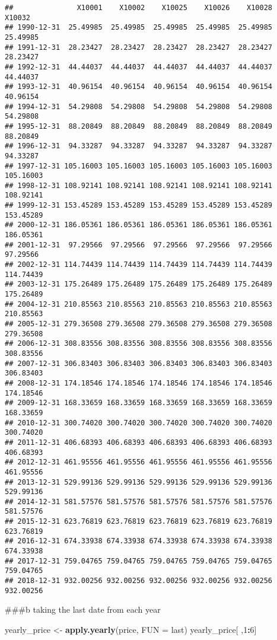 \documentclass[
]{article}
\newenvironment{Shaded}{\begin{snugshade}}{\end{snugshade}}
\newcommand{\AttributeTok}[1]{\textcolor[rgb]{0.13,0.29,0.53}{#1}}
\newcommand{\DecValTok}[1]{\textcolor[rgb]{0.00,0.00,0.81}{#1}}
\newcommand{\FunctionTok}[1]{\textcolor[rgb]{0.13,0.29,0.53}{\textbf{#1}}}
\newcommand{\NormalTok}[1]{#1}
\newcommand{\OtherTok}[1]{\textcolor[rgb]{0.56,0.35,0.01}{#1}}
\newcommand{\SpecialCharTok}[1]{\textcolor[rgb]{0.81,0.36,0.00}{\textbf{#1}}}
\begin{document}
\begin{verbatim}
##               X10001    X10002    X10025    X10026    X10028    X10032
## 1990-12-31  25.49985  25.49985  25.49985  25.49985  25.49985  25.49985
## 1991-12-31  28.23427  28.23427  28.23427  28.23427  28.23427  28.23427
## 1992-12-31  44.44037  44.44037  44.44037  44.44037  44.44037  44.44037
## 1993-12-31  40.96154  40.96154  40.96154  40.96154  40.96154  40.96154
## 1994-12-31  54.29808  54.29808  54.29808  54.29808  54.29808  54.29808
## 1995-12-31  88.20849  88.20849  88.20849  88.20849  88.20849  88.20849
## 1996-12-31  94.33287  94.33287  94.33287  94.33287  94.33287  94.33287
## 1997-12-31 105.16003 105.16003 105.16003 105.16003 105.16003 105.16003
## 1998-12-31 108.92141 108.92141 108.92141 108.92141 108.92141 108.92141
## 1999-12-31 153.45289 153.45289 153.45289 153.45289 153.45289 153.45289
## 2000-12-31 186.05361 186.05361 186.05361 186.05361 186.05361 186.05361
## 2001-12-31  97.29566  97.29566  97.29566  97.29566  97.29566  97.29566
## 2002-12-31 114.74439 114.74439 114.74439 114.74439 114.74439 114.74439
## 2003-12-31 175.26489 175.26489 175.26489 175.26489 175.26489 175.26489
## 2004-12-31 210.85563 210.85563 210.85563 210.85563 210.85563 210.85563
## 2005-12-31 279.36508 279.36508 279.36508 279.36508 279.36508 279.36508
## 2006-12-31 308.83556 308.83556 308.83556 308.83556 308.83556 308.83556
## 2007-12-31 306.83403 306.83403 306.83403 306.83403 306.83403 306.83403
## 2008-12-31 174.18546 174.18546 174.18546 174.18546 174.18546 174.18546
## 2009-12-31 168.33659 168.33659 168.33659 168.33659 168.33659 168.33659
## 2010-12-31 300.74020 300.74020 300.74020 300.74020 300.74020 300.74020
## 2011-12-31 406.68393 406.68393 406.68393 406.68393 406.68393 406.68393
## 2012-12-31 461.95556 461.95556 461.95556 461.95556 461.95556 461.95556
## 2013-12-31 529.99136 529.99136 529.99136 529.99136 529.99136 529.99136
## 2014-12-31 581.57576 581.57576 581.57576 581.57576 581.57576 581.57576
## 2015-12-31 623.76819 623.76819 623.76819 623.76819 623.76819 623.76819
## 2016-12-31 674.33938 674.33938 674.33938 674.33938 674.33938 674.33938
## 2017-12-31 759.04765 759.04765 759.04765 759.04765 759.04765 759.04765
## 2018-12-31 932.00256 932.00256 932.00256 932.00256 932.00256 932.00256
\end{verbatim}

\#\#\#b taking the last date from each year

\begin{Shaded}
\begin{Highlighting}[]
\NormalTok{yearly\_price }\OtherTok{\textless{}{-}} \FunctionTok{apply.yearly}\NormalTok{(price, }\AttributeTok{FUN =}\NormalTok{ last)}
\NormalTok{yearly\_price[ ,}\DecValTok{1}\SpecialCharTok{:}\DecValTok{6}\NormalTok{]}
\end{Highlighting}
\end{Shaded}
\end{document}

